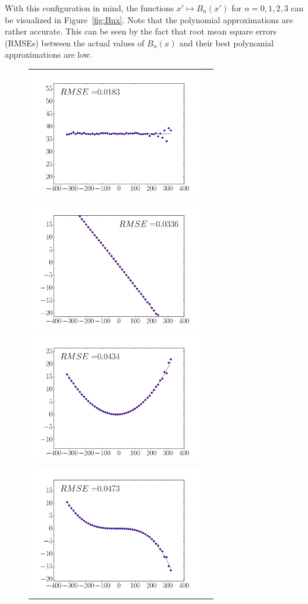 \documentclass[twocolumn]{IEEEtran}
\numberwithin{equation}{section}
\begin{document}
With this configuration in mind, the functions $x' \mapsto B_n(x')$ for $n = 0,1,2,3$ can be visualized in Figure~\ref{fig:Bnx}. Note that the polynomial approximations are rather accurate. This can be seen by the fact that root mean square errors (RMSEs) between the actual values of $B_n(x)$ and their best polynomial approximations are low.
\begin{figure}
	\centering
	\begin{tabular}{cc}
	\includegraphics[width=75mm]{figs/B0.png} \\
	\includegraphics[width=75mm]{figs/B1.png} \\
	\includegraphics[width=75mm]{figs/B2.png} \\
	\includegraphics[width=75mm]{figs/B3.png} 

\end{tabular}
\end{figure}
\end{document}
